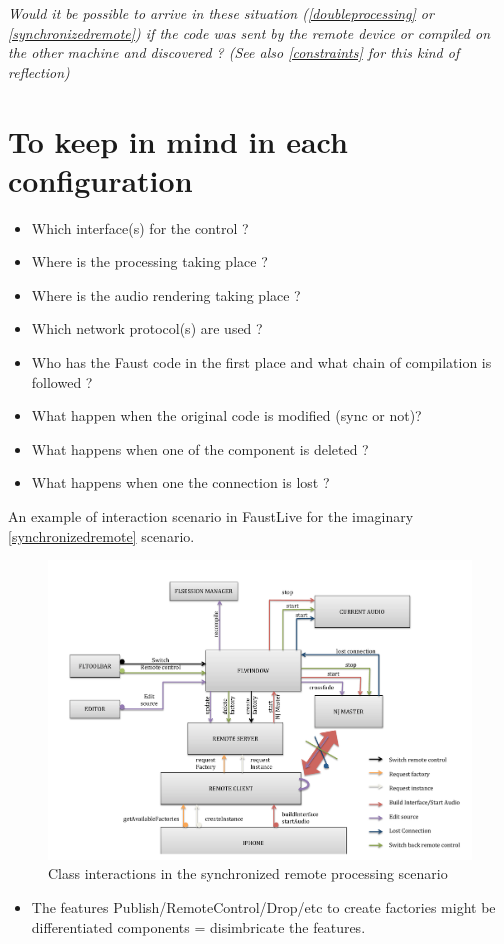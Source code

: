\documentclass[a4paper]{article}
\begin{document}
{\it Would it be possible to arrive in these situation (\ref{doubleprocessing} or \ref{synchronizedremote}) if the code was sent by the remote device or compiled on the other machine and discovered ? (See also \ref{constraints} for this kind of reflection)}

\newpage
\section{To keep in mind in each configuration}

\begin{itemize}
\item  Which interface(s) for the control ?
\item Where is the processing taking place ?
\item Where is the audio rendering taking place ?
\item Which network protocol(s) are used ?
\item Who has the Faust code in the first place and what chain of compilation is followed ?
\item What happen when the original code is modified (sync or not)?
\item What happens when one of the component is deleted ?
\item What happens when one the connection is lost ?\\
\end{itemize}


An example of interaction scenario in FaustLive for the imaginary \ref{synchronizedremote} scenario.

\begin{figure}[!h]
\begin{center}
\begin{minipage}[c]{\linewidth}
\includegraphics[width=\columnwidth]{images/RemoteControl.pdf}
\end{minipage}
\caption{Class interactions in the synchronized remote processing scenario}
\label{fig:remotecontrolInteractions}
\end{center}
\end{figure}

\begin{itemize}
\item The features Publish/RemoteControl/Drop/etc to create factories might be differentiated components = disimbricate the features.




\end{itemize}
\end{document}
